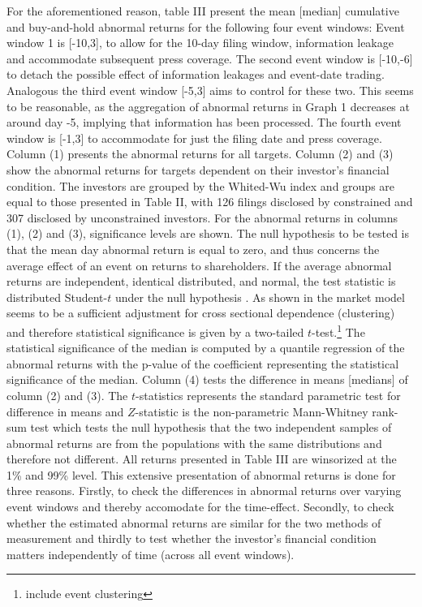 \documentclass[12pt]{article}
\begin{document}
For the aforementioned reason, table III present the mean [median] cumulative and buy-and-hold abnormal returns for the following four event windows: Event window 1 is [-10,3], to allow for the 10-day filing window, information leakage and accommodate subsequent press coverage. The second event window is [-10,-6] to detach the possible effect of information leakages and event-date trading. Analogous the third event window [-5,3] aims to control for these two. This seems to be reasonable, as the aggregation of abnormal returns in Graph 1 decreases at around day -5, implying that information has been processed. The fourth event window is [-1,3] to accommodate for just the filing date and press coverage. \\ 
Column (1) presents the abnormal returns for all targets. Column (2) and (3) show the abnormal returns for targets dependent on their investor's financial condition. The investors are grouped by the Whited-Wu index and groups are equal to those presented in Table II, with 126 filings disclosed by constrained and 307 disclosed by unconstrained investors. For the abnormal returns in columns (1), (2) and (3), significance levels are shown. The null hypothesis to be tested is that the mean day abnormal return is equal to zero, and thus concerns the average effect of an event on returns to shareholders. If the average abnormal returns are independent, identical distributed, and normal, the test statistic is distributed Student-$t$ under the null hypothesis \citep[p.7]{Brown1985}. As shown in \citet[p.22]{Brown1985} the market model seems to be a sufficient adjustment for cross sectional dependence (clustering) and therefore statistical significance is given by a two-tailed $t$-test.\footnote{include event clustering } The statistical significance of the median is computed by a quantile regression of the abnormal returns with the p-value of the coefficient representing the statistical significance of the median.  Column (4) tests the difference in means [medians] of column (2) and (3). The $t$-statistics represents the standard parametric test for difference in means and $Z$-statistic is the non-parametric Mann-Whitney rank-sum test which tests the null hypothesis that the two independent samples of abnormal returns are from the populations with the same distributions and therefore not different.
All returns  presented in Table III are winsorized at the 1\% and 99\% level. This extensive presentation of abnormal returns is done for three reasons. Firstly, to check the differences in abnormal returns over varying event windows and thereby accomodate for the time-effect. Secondly, to check whether the estimated abnormal returns are similar for the two methods of measurement and thirdly to test whether the investor's financial condition matters independently of time (across all event windows).
\end{document}
